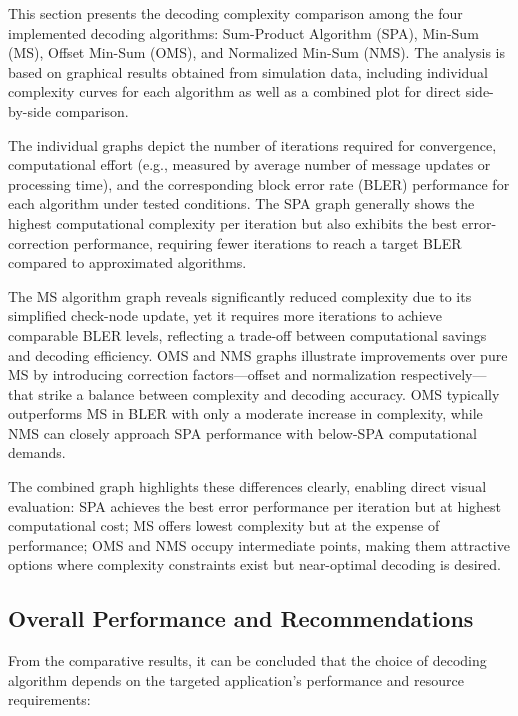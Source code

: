 \documentclass[../main.tex]{subfiles}
\begin{document}
This section presents the decoding complexity comparison among the four implemented decoding algorithms: Sum-Product Algorithm (SPA), Min-Sum (MS), Offset Min-Sum (OMS), and Normalized Min-Sum (NMS). The analysis is based on graphical results obtained from simulation data, including individual complexity curves for each algorithm as well as a combined plot for direct side-by-side comparison.

The individual graphs depict the number of iterations required for convergence, computational effort (e.g., measured by average number of message updates or processing time), and the corresponding block error rate (BLER) performance for each algorithm under tested conditions. The SPA graph generally shows the highest computational complexity per iteration but also exhibits the best error-correction performance, requiring fewer iterations to reach a target BLER compared to approximated algorithms.

The MS algorithm graph reveals significantly reduced complexity due to its simplified check-node update, yet it requires more iterations to achieve comparable BLER levels, reflecting a trade-off between computational savings and decoding efficiency. OMS and NMS graphs illustrate improvements over pure MS by introducing correction factors—offset and normalization respectively—that strike a balance between complexity and decoding accuracy. OMS typically outperforms MS in BLER with only a moderate increase in complexity, while NMS can closely approach SPA performance with below-SPA computational demands.

The combined graph highlights these differences clearly, enabling direct visual evaluation: SPA achieves the best error performance per iteration but at highest computational cost; MS offers lowest complexity but at the expense of performance; OMS and NMS occupy intermediate points, making them attractive options where complexity constraints exist but near-optimal decoding is desired.

\subsection{Overall Performance and Recommendations}

From the comparative results, it can be concluded that the choice of decoding algorithm depends on the targeted application’s performance and resource requirements:
\end{document}
